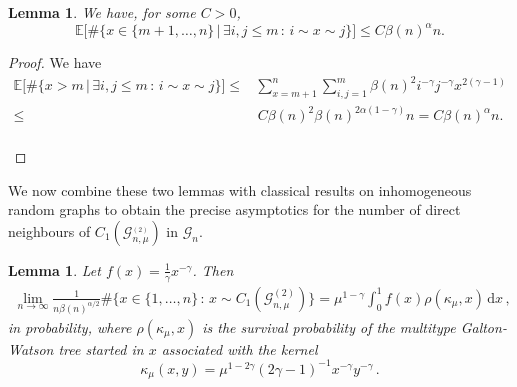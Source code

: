 \documentclass[12pt,a4paper]{article}
\numberwithin{equation}{section}
\newtheorem{lemma}[shared]{Lemma}
\begin{document}
\begin{lemma}\label{onecon}
We have, for some  $C>0$,
 $$\mathbb E\big[\#\{x\in\{m+1,\dots,n\} \,|\, \exists i,j\le m \,:\,i\sim x\sim j\} \big] \le C \beta(n)^\alpha n.$$
\end{lemma}

\begin{proof}
We have
 \begin{equation*}
    \begin{aligned}
        \mathbb E\big[\#\{x>m \,|\, \exists i,j\le m \,:\,i\sim x\sim j\} \big] \le & \sum_{x=m+1}^n \sum_{i,j=1}^{m} \beta(n)^2 i^{-\gamma}j^{-\gamma}x^{2(\gamma-1)} 
        \\ \le &\, C  \beta(n)^2 \beta(n)^{2\alpha(1-\gamma)}n = C \beta(n)^\alpha n.
    \end{aligned}
 \end{equation*}
 \ \\[-1cm]
 \end{proof}
 \medskip
 
 
We now combine these two lemmas with classical results on inhomogeneous random graphs to obtain the precise asymptotics for the number of direct neighbours of $C_1(\mathcal G_{n,\mu}^{_{(2)}})$ in $\mathscr G_n$. 
\smallskip

\begin{lemma}\label{neigh_asymp}
Let  $f(x)=\tfrac{1}{\gamma}x^{-\gamma}$.
Then
\begin{align}\label{pconv}
     \lim_{n\to\infty} \frac{1}{n\beta(n)^{\alpha/2}}\#\big\{x\in\{1,\dots,n\}\,:\, x \sim C_1(\mathcal G_{n,\mu}^{(2)}) \}  = %
     \mu^{1-\gamma} \int_0^1 f(x) \rho(\kappa_\mu , x)\,\text{d}x\,,
\end{align}
in probability, where $\rho(\kappa_\mu , x)$ is the survival probability of the multitype Galton-Watson tree started in $x$ associated with the kernel $$\kappa_\mu(x,y)= \mu^{1-2\gamma}(2\gamma-1)^{-1}x^{-\gamma}y^{-\gamma}\,.$$
\end{lemma}

\end{document}
